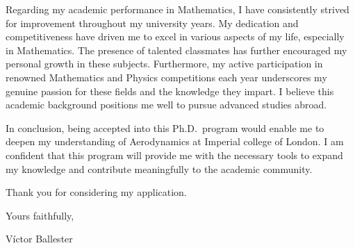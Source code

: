 \documentclass{letter}
\newcommand{\uni}{Imperial college of London}
\begin{document}
\begin{letter}
  Regarding my academic performance in Mathematics, I have consistently strived for improvement throughout my university years. My dedication and competitiveness have driven me to excel in various aspects of my life, especially in Mathematics. The presence of talented classmates has further encouraged my personal growth in these subjects. Furthermore, my active participation in renowned Mathematics and Physics competitions each year underscores my genuine passion for these fields and the knowledge they impart. I believe this academic background positions me well to pursue advanced studies abroad.


  In conclusion, being accepted into this Ph.D.\ program would enable me to deepen my understanding of Aerodynamics at \uni. I am confident that this program will provide me with the necessary tools to expand my knowledge and contribute meaningfully to the academic community.

  Thank you for considering my application.
  \bigskip

  Yours faithfully,

  Víctor Ballester

\end{letter}
\end{document}
